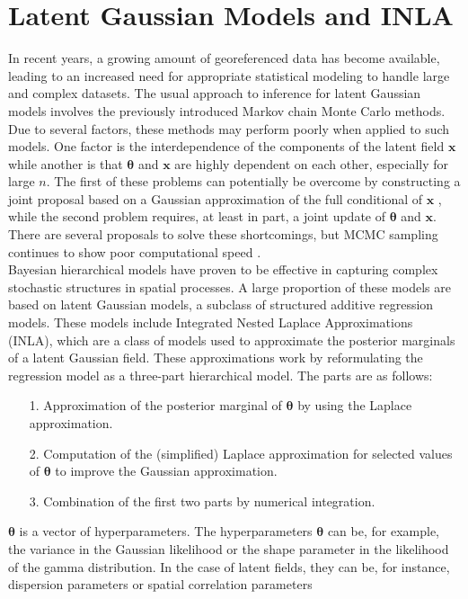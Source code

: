 \section{Latent Gaussian Models and INLA}
In recent years, a growing amount of georeferenced data has become available, leading to an increased need for appropriate statistical modeling to handle large and complex datasets. The usual approach to inference for latent Gaussian models involves the previously introduced Markov chain Monte Carlo methods. Due to several factors, these methods may perform poorly when applied to such models. One factor is the interdependence of the components of the latent field $\pmb{x}$ while another is that $\pmb{\theta}$ and $\pmb{x}$ are highly dependent on each other, especially for large $n$. The first of these problems can potentially be overcome by constructing a joint proposal based on a Gaussian approximation of the full conditional of $\pmb{x}$ \autocite[][]{gamerman1997sampling}, while the second problem requires, at least in part, a joint update of $\pmb{\theta}$ and $\pmb{x}$. There are several proposals to solve these shortcomings, but MCMC sampling continues to show poor computational speed \autocite[][322]{rue2009approximate}.\\
Bayesian hierarchical models have proven to be effective in capturing complex stochastic structures in spatial processes. A large proportion of these models are based on latent Gaussian models, a subclass of structured additive regression models. These models include Integrated Nested Laplace Approximations (INLA), which are a class of models used to approximate the posterior marginals of a latent Gaussian field. These approximations work by reformulating the regression model as a three-part hierarchical model. The parts are as follows:
\begin{itemize}
    \item[1.] Approximation of the posterior marginal of $\pmb{\theta}$ by using the Laplace approximation.
    \item[2.] Computation of the (simplified) Laplace approximation for selected values of $\pmb{\theta}$ to improve the Gaussian approximation.
    \item[3.] Combination of the first two parts by numerical integration.
\end{itemize}
$\pmb{\theta}$ is a vector of hyperparameters. The hyperparameters $\pmb{\theta}$ can be, for example, the variance in the Gaussian likelihood or the shape parameter in the likelihood of the gamma distribution. In the case of latent fields, they can be, for instance, dispersion parameters or spatial correlation parameters \autocite[][]{rue2009approximate}
